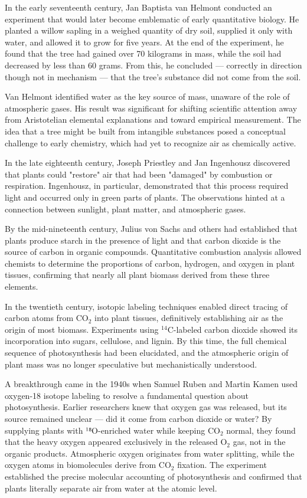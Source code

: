 \begin{historical}
In the early seventeenth century, Jan Baptista van Helmont conducted an experiment that would later become emblematic of early quantitative biology. He planted a willow sapling in a weighed quantity of dry soil, supplied it only with water, and allowed it to grow for five years. At the end of the experiment, he found that the tree had gained over 70 kilograms in mass, while the soil had decreased by less than 60 grams. From this, he concluded — correctly in direction though not in mechanism — that the tree's substance did not come from the soil.

Van Helmont identified water as the key source of mass, unaware of the role of atmospheric gases. His result was significant for shifting scientific attention away from Aristotelian elemental explanations and toward empirical measurement. The idea that a tree might be built from intangible substances posed a conceptual challenge to early chemistry, which had yet to recognize air as chemically active.

In the late eighteenth century, Joseph Priestley and Jan Ingenhousz discovered that plants could "restore" air that had been "damaged" by combustion or respiration. Ingenhousz, in particular, demonstrated that this process required light and occurred only in green parts of plants. The observations hinted at a connection between sunlight, plant matter, and atmospheric gases.

By the mid-nineteenth century, Julius von Sachs and others had established that plants produce starch in the presence of light and that carbon dioxide is the source of carbon in organic compounds. Quantitative combustion analysis allowed chemists to determine the proportions of carbon, hydrogen, and oxygen in plant tissues, confirming that nearly all plant biomass derived from these three elements.

In the twentieth century, isotopic labeling techniques enabled direct tracing of carbon atoms from \(\mathrm{CO}_2\) into plant tissues, definitively establishing air as the origin of most biomass. Experiments using \(^{14}\mathrm{C}\)-labeled carbon dioxide showed its incorporation into sugars, cellulose, and lignin. By this time, the full chemical sequence of photosynthesis had been elucidated, and the atmospheric origin of plant mass was no longer speculative but mechanistically understood.

A breakthrough came in the 1940s when Samuel Ruben and Martin Kamen used oxygen-18 isotope labeling to resolve a fundamental question about photosynthesis. Earlier researchers knew that oxygen gas was released, but its source remained unclear — did it come from carbon dioxide or water? By supplying plants with ¹⁸O-enriched water while keeping \(\mathrm{CO}_2\) normal, they found that the heavy oxygen appeared exclusively in the released \(\mathrm{O}_2\) gas, not in the organic products. Atmospheric oxygen originates from water splitting, while the oxygen atoms in biomolecules derive from \(\mathrm{CO}_2\) fixation. The experiment established the precise molecular accounting of photosynthesis and confirmed that plants literally separate air from water at the atomic level.


\end{historical}
